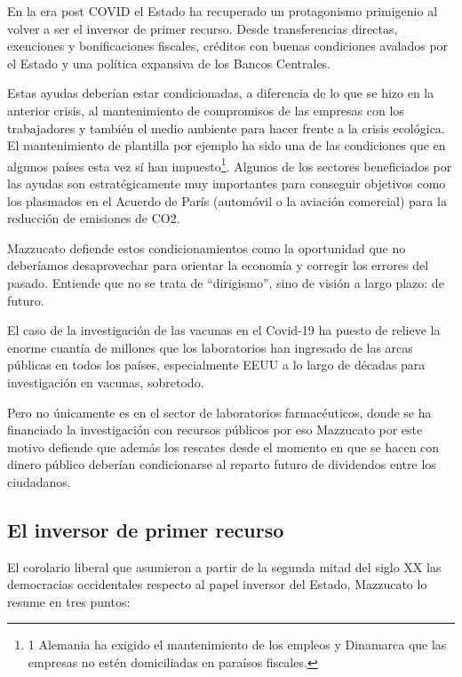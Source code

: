 \documentclass[
]{article}
\begin{document}
En la era post COVID el Estado ha recuperado un protagonismo primigenio
al volver a ser el inversor de primer recurso. Desde transferencias
directas, exenciones y bonificaciones fiscales, créditos con buenas
condiciones avalados por el Estado y una política expansiva de los
Bancos Centrales.

Estas ayudas deberían estar condicionadas, a diferencia de lo que se
hizo en la anterior crisis, al mantenimiento de compromisos de las
empresas con los trabajadores y también el medio ambiente para hacer
frente a la crisis ecológica. El mantenimiento de plantilla por ejemplo
ha sido una de las condiciones que en algunos países esta vez sí han
impuesto\footnote{1 Alemania ha exigido el mantenimiento de los empleos
  y Dinamarca que las empresas no estén domiciliadas en paraísos
  fiscales.}. Algunos de los sectores beneficiados por las ayudas son
estratégicamente muy importantes para conseguir objetivos como los
plasmados en el Acuerdo de París (automóvil o la aviación comercial)
para la reducción de emisiones de CO2.

Mazzucato defiende estos condicionamientos como la oportunidad que no
deberíamos desaprovechar para orientar la economía y corregir los
errores del pasado. Entiende que no se trata de ``dirigismo'', sino de
visión a largo plazo: de futuro.

El caso de la investigación de las vacunas en el Covid-19 ha puesto de
relieve la enorme cuantía de millones que los laboratorios han ingresado
de las arcas públicas en todos los países, especialmente EEUU a lo largo
de décadas para investigación en vacunas, sobretodo.

Pero no únicamente es en el sector de laboratorios farmacéuticos, donde
se ha financiado la investigación con recursos públicos por eso
Mazzucato por este motivo defiende que además los rescates desde el
momento en que se hacen con dinero público deberían condicionarse al
reparto futuro de dividendos entre los ciudadanos.

\hypertarget{el-inversor-de-primer-recurso}{%
\subsection{El inversor de primer
recurso}\label{el-inversor-de-primer-recurso}}

El corolario liberal que asumieron a partir de la segunda mitad del
siglo XX las democracias occidentales respecto al papel inversor del
Estado, Mazzucato lo resume en tres puntos:
\end{document}
